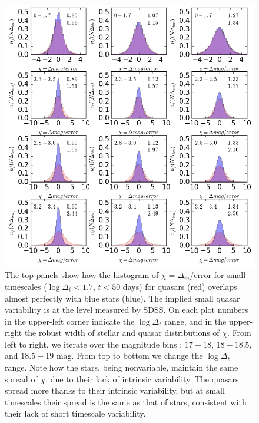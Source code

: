 \documentclass[fleqn,usenatbib]{mnras}  %
\begin{document}
\begin{figure}
\label{fig:histograms}
\includegraphics[width=1.1\columnwidth]{Fig_3_histogram_panels_NEW.png}
 \caption{The top panels show how the histogram of  $\chi = \Delta_{m}/ \mathrm{error}$ for small  timescales ($\log{\Delta_{t}} < 1.7$, $t<50$ days) for  quasars (red) overlaps almost perfectly with blue stars (blue). The  implied small quasar variability is at the level  measured by SDSS. On each plot numbers in the upper-left corner indicate the $\log{\Delta_{t}}$ range, and in the upper-right the robust width of stellar and quasar distributions of $\chi$.  From left to right, we iterate over the  magnitude bins :  $17-18$,  $18-18.5$, and $18.5-19$ mag. From top to bottom we change the  $\log{\Delta_{t}}$  range. Note how  the  stars, being nonvariable, maintain the same spread of $\chi$, due to their lack of intrinsic variability. The quasars spread more thanks to their intrinsic variability, but at small timescales their spread is  the same as that of stars, consistent with their lack of short timescale variability. }
\end{figure}
\end{document}
